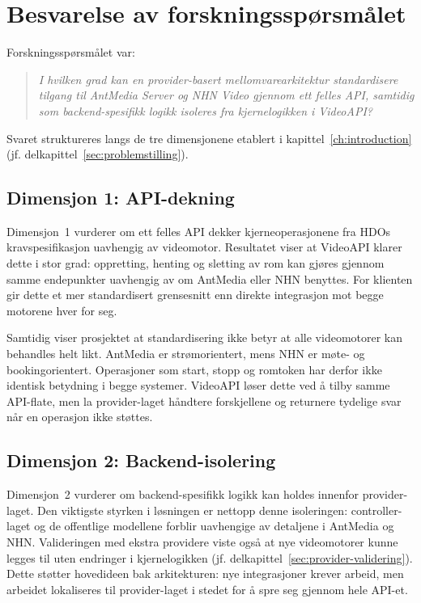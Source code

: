 \section{Besvarelse av forskningsspørsmålet}
\label{sec:forskningsspm}

Forskningsspørsmålet var:

\begin{quote}
\textit{I hvilken grad kan en provider-basert mellomvarearkitektur standardisere
tilgang til AntMedia Server og NHN Video gjennom ett felles API, samtidig
som backend-spesifikk logikk isoleres fra kjernelogikken i VideoAPI?}
\end{quote}

Svaret struktureres langs de tre dimensjonene etablert i
kapittel~\ref{ch:introduction} (jf. delkapittel~\ref{sec:problemstilling}).

\subsection{Dimensjon 1: API-dekning}
\label{sec:dim-api-dekning}

Dimensjon~1 vurderer om ett felles API dekker kjerneoperasjonene fra HDOs
kravspesifikasjon uavhengig av videomotor. Resultatet viser
at VideoAPI klarer dette i stor grad: oppretting, henting og sletting av rom
kan gjøres gjennom samme endepunkter uavhengig av om AntMedia eller NHN
benyttes. For klienten gir dette et mer standardisert grensesnitt enn direkte
integrasjon mot begge motorene hver for seg.

Samtidig viser prosjektet at standardisering ikke betyr at alle videomotorer
kan behandles helt likt. AntMedia er strømorientert, mens NHN er møte- og
bookingorientert. Operasjoner som start, stopp og romtoken har derfor ikke
identisk betydning i begge systemer. VideoAPI løser dette ved å tilby samme
API-flate, men la provider-laget håndtere forskjellene og returnere tydelige
svar når en operasjon ikke støttes.

\subsection{Dimensjon 2: Backend-isolering}
\label{sec:dim-backend-isolering}

Dimensjon~2 vurderer om backend-spesifikk logikk kan holdes innenfor
provider-laget. Den viktigste styrken i løsningen er nettopp denne
isoleringen: controller-laget og de offentlige modellene forblir uavhengige
av detaljene i AntMedia og NHN. Valideringen med ekstra providere viste også
at nye videomotorer kunne legges til uten endringer i kjernelogikken
(jf. delkapittel~\ref{sec:provider-validering}). Dette støtter hovedideen
bak arkitekturen: nye integrasjoner krever arbeid, men arbeidet lokaliseres
til provider-laget i stedet for å spre seg gjennom hele API-et.

